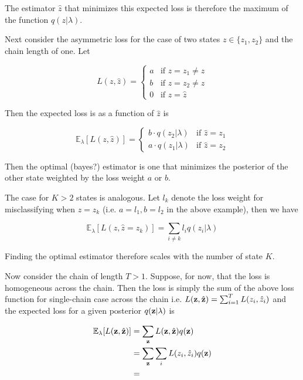 \documentclass{article}
\newcommand{\vz}{{\bf z}}
\newcommand{\hz}{{\hat{z}}}
\begin{document}
The estimator $\hat{z}$ that minimizes this expected loss is therefore the maximum of the function $q(z|\lambda)$.

Next consider the asymmetric loss for the case of two states $z \in  \{ z_1, z_2 \}$ and the chain length of one. Let

\[
 L(z, \hat{z}) = 
  \begin{cases} 
   a  & \text{if } z = z_1 \neq \hat{z} \\
   b  & \text{if } z = z_2 \neq \hat{z} \\
   0  & \text{if } z = \hz
  \end{cases}
\]

Then the expected loss is as a function of $\hat{z}$ is

\[
 \mathbb{E}_\lambda[L(z, \hat{z})] = 
  \begin{cases} 
   b \cdot q(z_2|\lambda)  & \text{if } \hz = z_1 \\
   a \cdot q(z_1|\lambda)  & \text{if } \hz = z_2
  \end{cases}
\]

Then the optimal (bayes?) estimator is one that minimizes the posterior of the other state weighted by the loss weight $a$ or $b$.

The case for $K > 2$ states is analogous. Let $l_k$ denote the loss weight for misclassifying when $z = z_k$ (i.e. $a = l_1, b = l_2$ in the above example), then we have

\begin{equation}
\mathbb{E}_\lambda[L(z, \hat{z} = z_k)] = \sum_{i \neq k} l_i q(z_i|\lambda)
\end{equation}

Finding the optimal estimator therefore scales with the number of state $K$. 

Now consider the chain of length $T > 1$. Suppose, for now, that the loss is homogeneous across the chain. Then the loss is simply the sum of the above loss function for single-chain case across the chain i.e. $L(\vz, \hat{\vz}) = \sum_{i=1}^T L(z_i, \hz_i)$ and the expected loss for a given posterior $q(\vz|\lambda)$ is


\begin{align}
\mathbb{E}_\lambda[L(\vz, \hat{\vz})] &= \sum_{\vz} L(\vz, \hat{\vz}) q(\vz)  \\
                                      &= \sum_{\vz} \sum_i L(z_i, \hz_i) q(\vz) \\
                                      &= 
\end{align}
\end{document}

